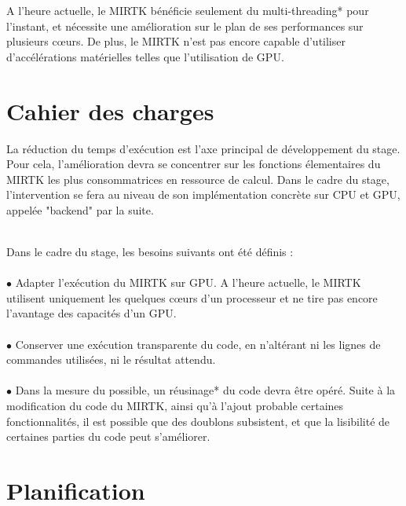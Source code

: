 \documentclass[10pt]{report}
\begin{document}
	A l'heure actuelle, le MIRTK bénéficie seulement du multi-threading* pour l'instant, et nécessite une amélioration sur le plan de ses performances sur plusieurs cœurs. De plus,  le MIRTK n'est pas encore capable d'utiliser d'accélérations matérielles telles que l'utilisation de GPU.
	\newpage
	\section{Cahier des charges}
	La réduction du temps d'exécution est l'axe principal de développement du stage. Pour cela, l'amélioration devra se concentrer sur les fonctions élementaires du MIRTK les plus consommatrices en ressource de calcul. Dans le cadre du stage, l'intervention se fera au niveau de son implémentation concrète sur CPU et GPU, appelée "backend" par la suite.\\ ~\par
	
	\noindent Dans le cadre du stage, les besoins suivants ont été définis : \\
	\\{$\bullet$} Adapter l'exécution du MIRTK sur GPU. A l'heure actuelle, le MIRTK utilisent uniquement les quelques cœurs d'un processeur et ne tire pas encore l'avantage des capacités d'un GPU.\\
	\\{$\bullet$} Conserver une exécution transparente du code, en n'altérant ni les lignes de commandes utilisées, ni le résultat attendu.  \\
	\\{$\bullet$} Dans la mesure du possible, un réusinage* du code devra être opéré. Suite à la modification du code du MIRTK, ainsi qu'à l'ajout probable certaines fonctionnalités, il est possible que des doublons subsistent, et que la lisibilité de certaines parties du code peut s'améliorer.	
	\section{Planification}
\end{document}
